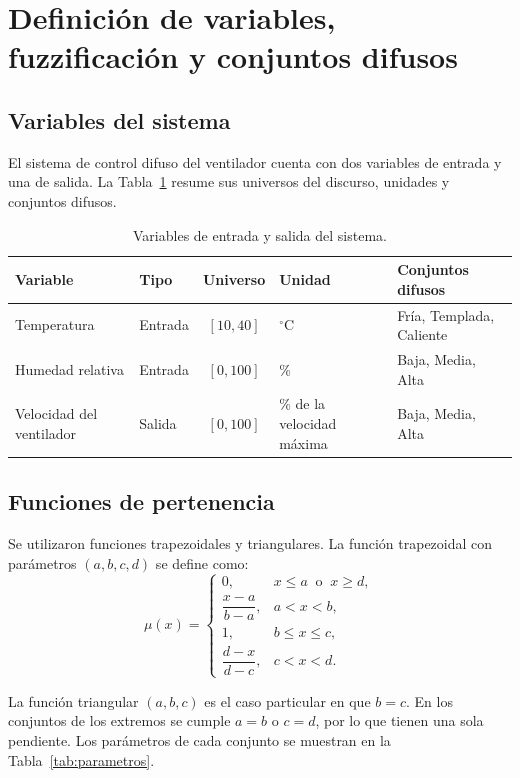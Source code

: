 \documentclass[11pt]{article}
\begin{document}
\section{Definición de variables, fuzzificación y conjuntos difusos}

\subsection{Variables del sistema}

El sistema de control difuso del ventilador cuenta con dos variables de entrada y una de salida. La Tabla~\ref{tab:variables} resume sus universos del discurso, unidades y conjuntos difusos.

\begin{table}[h]
\centering
\caption{Variables de entrada y salida del sistema.}
\label{tab:variables}
\begin{tabular}{llcp{2.6cm}l}
\toprule
\textbf{Variable} & \textbf{Tipo} & \textbf{Universo} & \textbf{Unidad} & \textbf{Conjuntos difusos} \\
\midrule
Temperatura & Entrada & $[10, 40]$ & $^\circ$C & Fría, Templada, Caliente \\
Humedad relativa & Entrada & $[0, 100]$ & \% & Baja, Media, Alta \\
Velocidad del ventilador & Salida & $[0, 100]$ & \% de la velocidad máxima & Baja, Media, Alta \\
\bottomrule
\end{tabular}
\end{table}

\subsection{Funciones de pertenencia}

Se utilizaron funciones trapezoidales y triangulares. La función trapezoidal con parámetros $(a, b, c, d)$ se define como:
\[
\mu(x) =
\begin{cases}
0, & x \le a \ \text{ o } \ x \ge d, \\[4pt]
\dfrac{x - a}{b - a}, & a < x < b, \\[8pt]
1, & b \le x \le c, \\[4pt]
\dfrac{d - x}{d - c}, & c < x < d.
\end{cases}
\]

La función triangular $(a, b, c)$ es el caso particular en que $b = c$. En los conjuntos de los extremos se cumple $a = b$ o $c = d$, por lo que tienen una sola pendiente. Los parámetros de cada conjunto se muestran en la Tabla~\ref{tab:parametros}.
\end{document}
